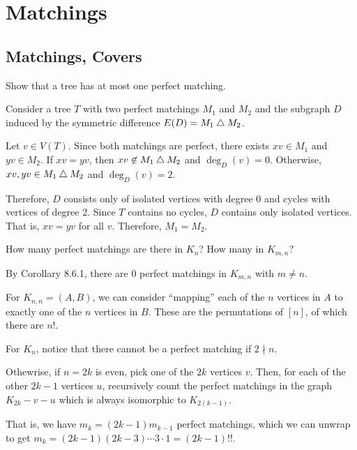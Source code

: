 \section{Matchings}

\setcounter{subsection}{1}
\subsection{Matchings, Covers}

\begin{xca}
  Show that a tree has at most one perfect matching.
\end{xca}
\begin{prf}
  Consider a tree $T$ with two perfect matchings $M_1$ and $M_2$
  and the subgraph $D$ induced by the symmetric difference $E(D) = M_1 \mathbin{\triangle} M_2$.

  Let $v \in V(T)$. Since both matchings are perfect,
  there exists $xv \in M_1$ and $yv \in M_2$.
  If $xv = yv$, then $xv \not\in M_1 \mathbin{\triangle} M_2$ and $\deg_D(v) = 0$.
  Otherwise, $xv,yv \in M_1 \mathbin{\triangle} M_2$ and $\deg_D(v) = 2$.

  Therefore, $D$ consists only of isolated vertices with degree 0
  and cycles with vertices of degree 2.
  Since $T$ contains no cycles, $D$ contains only isolated vertices.
  That is, $xv = yv$ for all $v$.
  Therefore, $M_1 = M_2$.
\end{prf}

\begin{xca}\label{xca:822}
  How many perfect matchings are there in $K_n$?
  How many in $K_{m,n}$?
\end{xca}
\begin{sol}
  By Corollary 8.6.1, there are 0 perfect matchings in $K_{m,n}$ with $m \neq n$.

  For $K_{n,n} = (A, B)$, we can consider ``mapping''
  each of the $n$ vertices in $A$ to exactly one of the $n$ vertices in $B$.
  These are the permutations of $[n]$, of which there are $n!$.

  For $K_n$, notice that there cannot be a perfect matching if $2 \nmid n$.

  Othewrise, if $n = 2k$ is even, pick one of the $2k$ vertices $v$.
  Then, for each of the other $2k-1$ vertices $u$,
  recursively count the perfect matchings in the graph $K_{2k}-v-u$
  which is always isomorphic to $K_{2(k-1)}$.

  That is, we have $m_k = (2k-1)m_{k-1}$ perfect matchings,
  which we can unwrap to get $m_k = (2k-1)(2k-3)\cdots3\cdot1 = (2k-1)!!$.
\end{sol}

